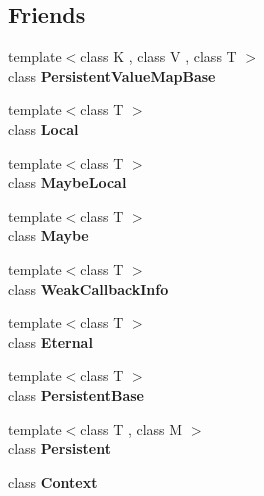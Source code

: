 \subsection*{Friends}
\begin{DoxyCompactItemize}
\item 
{\footnotesize template$<$class K , class V , class T $>$ }\\class {\bfseries Persistent\+Value\+Map\+Base}\hypertarget{classv8_1_1_v8_a08e2b8f164392d71811ce6cc134f33e3}{}\label{classv8_1_1_v8_a08e2b8f164392d71811ce6cc134f33e3}

\item 
{\footnotesize template$<$class T $>$ }\\class {\bfseries Local}\hypertarget{classv8_1_1_v8_afb872edb4aac7ba55f0da004113aa2b0}{}\label{classv8_1_1_v8_afb872edb4aac7ba55f0da004113aa2b0}

\item 
{\footnotesize template$<$class T $>$ }\\class {\bfseries Maybe\+Local}\hypertarget{classv8_1_1_v8_a8c1dab86fc095fca89075da411a82209}{}\label{classv8_1_1_v8_a8c1dab86fc095fca89075da411a82209}

\item 
{\footnotesize template$<$class T $>$ }\\class {\bfseries Maybe}\hypertarget{classv8_1_1_v8_ae606ba8c3656041ee7ec7532d02a3bdb}{}\label{classv8_1_1_v8_ae606ba8c3656041ee7ec7532d02a3bdb}

\item 
{\footnotesize template$<$class T $>$ }\\class {\bfseries Weak\+Callback\+Info}\hypertarget{classv8_1_1_v8_aeeef5ad4ce5906cf147f93645284ebdf}{}\label{classv8_1_1_v8_aeeef5ad4ce5906cf147f93645284ebdf}

\item 
{\footnotesize template$<$class T $>$ }\\class {\bfseries Eternal}\hypertarget{classv8_1_1_v8_adf5d8780aceb9310fb1246aae7ec348e}{}\label{classv8_1_1_v8_adf5d8780aceb9310fb1246aae7ec348e}

\item 
{\footnotesize template$<$class T $>$ }\\class {\bfseries Persistent\+Base}\hypertarget{classv8_1_1_v8_abb172e0bb22fc5fed7a3a66f29d046ce}{}\label{classv8_1_1_v8_abb172e0bb22fc5fed7a3a66f29d046ce}

\item 
{\footnotesize template$<$class T , class M $>$ }\\class {\bfseries Persistent}\hypertarget{classv8_1_1_v8_ad845ec8872174be0a9ca9a3dd1898d30}{}\label{classv8_1_1_v8_ad845ec8872174be0a9ca9a3dd1898d30}

\item 
class {\bfseries Context}\hypertarget{classv8_1_1_v8_ac26c806e60ca4a0547680edb68f6e39b}{}\label{classv8_1_1_v8_ac26c806e60ca4a0547680edb68f6e39b}

\end{DoxyCompactItemize}


